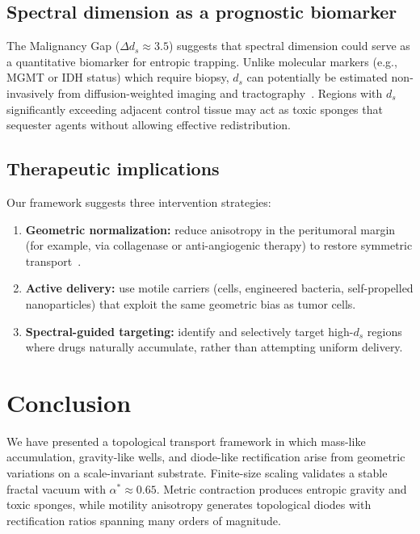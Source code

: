 \documentclass[aps,pre,twocolumn,superscriptaddress,10pt,floatfix]{revtex4-2}
\begin{document}
\subsection{Spectral dimension as a prognostic biomarker}

The Malignancy Gap ($\Delta d_s \approx 3.5$) suggests that spectral dimension could serve as a quantitative biomarker for entropic trapping. Unlike molecular markers (e.g., MGMT or IDH status) which require biopsy, $d_s$ can potentially be estimated non-invasively from diffusion-weighted imaging and tractography~\cite{bullmore2009}. Regions with $d_s$ significantly exceeding adjacent control tissue may act as toxic sponges that sequester agents without allowing effective redistribution.

\subsection{Therapeutic implications}

Our framework suggests three intervention strategies:
\begin{enumerate}
  \item \textbf{Geometric normalization:} reduce anisotropy in the peritumoral margin (for example, via collagenase or anti-angiogenic therapy) to restore symmetric transport~\cite{chauhan2012}.
  \item \textbf{Active delivery:} use motile carriers (cells, engineered bacteria, self-propelled nanoparticles) that exploit the same geometric bias as tumor cells.
  \item \textbf{Spectral-guided targeting:} identify and selectively target high-$d_s$ regions where drugs naturally accumulate, rather than attempting uniform delivery.
\end{enumerate}

\section{Conclusion}

We have presented a topological transport framework in which mass-like accumulation, gravity-like wells, and diode-like rectification arise from geometric variations on a scale-invariant substrate. Finite-size scaling validates a stable fractal vacuum with $\alpha^\ast \approx 0.65$. Metric contraction produces entropic gravity and toxic sponges, while motility anisotropy generates topological diodes with rectification ratios spanning many orders of magnitude.
\end{document}

